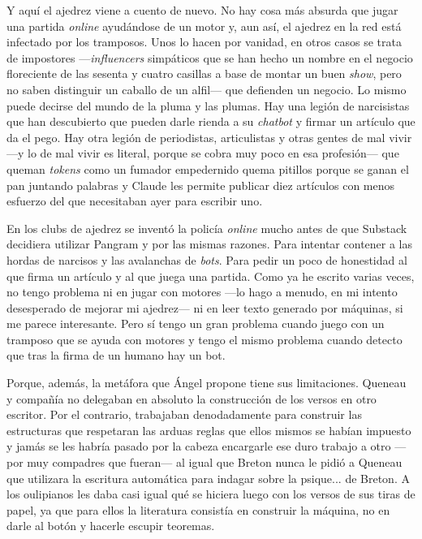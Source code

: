 \documentclass[11pt,a4paper]{article}
\begin{document}
Y aquí el ajedrez viene a cuento de nuevo. No hay cosa más absurda que jugar una partida \emph{online} ayudándose de un motor
y, aun así, el ajedrez en la red está infectado por los tramposos. Unos lo hacen por vanidad, en otros casos se trata de impostores ---\emph{influencers} simpáticos que se han hecho un nombre en el negocio floreciente de las sesenta y cuatro casillas a base de montar un buen \emph{show}, pero no saben distinguir un caballo de un alfil--- que defienden un negocio. Lo mismo puede decirse del mundo de la pluma y las plumas. Hay una legión de narcisistas que han descubierto que pueden darle rienda a su \emph{chatbot} y firmar un artículo que da el pego. Hay otra legión de periodistas, articulistas y otras gentes de mal vivir ---y lo de mal vivir es literal, porque se cobra muy poco en esa profesión--- que queman \emph{tokens} como un fumador empedernido quema pitillos porque se ganan el pan juntando palabras y Claude les permite publicar diez artículos con menos esfuerzo del que necesitaban ayer para escribir uno. 

En los clubs de ajedrez se inventó la policía \emph{online} mucho antes de que Substack decidiera utilizar Pangram y por las mismas razones. Para intentar contener a las hordas de narcisos y las avalanchas de \emph{bots}. Para pedir un poco de honestidad al que firma un artículo y al que juega una partida. Como ya he escrito varias veces, no tengo problema ni en jugar con motores ---lo hago a menudo, en mi intento desesperado de mejorar mi ajedrez--- ni en leer texto generado por máquinas, si me parece interesante. Pero sí tengo un gran problema cuando juego con un tramposo que se ayuda con motores y tengo el mismo problema cuando detecto que tras la firma de un humano hay un bot. 

Porque, además, la metáfora que Ángel propone tiene sus limitaciones. Queneau y compañía no delegaban en absoluto la construcción de los versos en otro escritor. Por el contrario, trabajaban denodadamente para construir las estructuras que respetaran las arduas reglas que ellos mismos se habían impuesto y jamás se les habría pasado por la cabeza encargarle ese duro trabajo a otro ---por muy compadres que fueran--- al igual que Breton nunca le pidió a Queneau que utilizara la escritura automática para indagar sobre la psique... de Breton. A los oulipianos les daba casi igual qué se hiciera luego con los versos de sus tiras de papel, ya que para ellos la literatura consistía en construir la máquina, no en darle al botón y hacerle escupir teoremas. 
\end{document}
